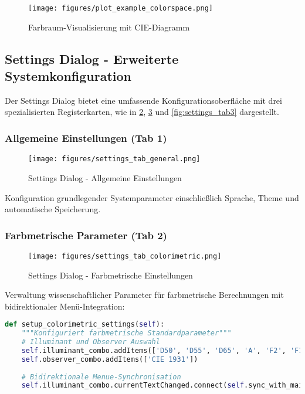 \begin{figure}[H]
\centering
\texttt{[image: figures/plot\_example\_colorspace.png]}
\caption{Farbraum-Visualisierung mit CIE-Diagramm}
\label{fig:plot_example2}
\end{figure}

\subsection{Settings Dialog - Erweiterte Systemkonfiguration}

Der Settings Dialog bietet eine umfassende Konfigurationsoberfläche mit drei spezialisierten Registerkarten, wie in \ref{fig:settings_tab1}, \ref{fig:settings_tab2} und \ref{fig:settings_tab3} dargestellt.

\subsubsection{Allgemeine Einstellungen (Tab 1)}

\begin{figure}[H]
    \centering
\texttt{[image: figures/settings\_tab\_general.png]}
\caption{Settings Dialog - Allgemeine Einstellungen}
\label{fig:settings_tab1}
\end{figure}

Konfiguration grundlegender Systemparameter einschließlich Sprache, Theme und automatische Speicherung.

\subsubsection{Farbmetrische Parameter (Tab 2)}

\begin{figure}[H]
    \centering
\texttt{[image: figures/settings\_tab\_colorimetric.png]}
\caption{Settings Dialog - Farbmetrische Einstellungen}
\label{fig:settings_tab2}
\end{figure}

Verwaltung wissenschaftlicher Parameter für farbmetrische Berechnungen mit bidirektionaler Menü-Integration:

\begin{lstlisting}[language=Python, caption=Farbmetrische Parameter-Verwaltung]
def setup_colorimetric_settings(self):
    """Konfiguriert farbmetrische Standardparameter"""
    # Illuminant und Observer Auswahl
    self.illuminant_combo.addItems(['D50', 'D55', 'D65', 'A', 'F2', 'F11'])
    self.observer_combo.addItems(['CIE 1931'])
    
    # Bidirektionale Menue-Synchronisation
    self.illuminant_combo.currentTextChanged.connect(self.sync_with_main_menu)
\end{lstlisting}

